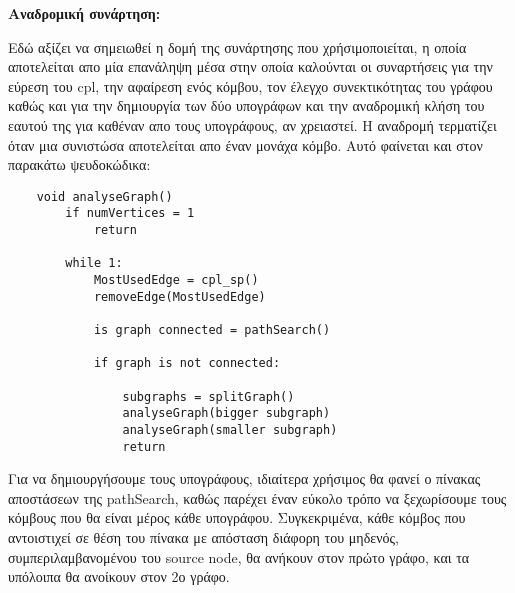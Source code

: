 \documentclass{article}
\begin{document}
\textbf{Αναδρομική συνάρτηση:}\bigbreak

Εδώ αξίζει να σημειωθεί η δομή της συνάρτησης που χρήσιμοποιείται, η οποία αποτελείται απο μία επανάληψη μέσα στην οποία καλούνται οι συναρτήσεις για την εύρεση του
cpl, την αφαίρεση ενός κόμβου, τον έλεγχο συνεκτικότητας του γράφου καθώς και για την δημιουργία των δύο υπογράφων και
την αναδρομική κλήση του εαυτού της για καθέναν απο τους υπογράφους, αν χρειαστεί. Η αναδρομή τερματίζει όταν μια συνιστώσα αποτελείται απο έναν μονάχα κόμβο.
Αυτό φαίνεται και στον παρακάτω ψευδοκώδικα:\bigbreak

\begin{lstlisting}
	void analyseGraph()
		if numVertices = 1	
			return
		
		while 1:
			MostUsedEdge = cpl_sp()
			removeEdge(MostUsedEdge)
			
			is graph connected = pathSearch()
	
			if graph is not connected:

				subgraphs = splitGraph()
				analyseGraph(bigger subgraph)								
				analyseGraph(smaller subgraph)				
				return
\end{lstlisting}\bigbreak{}

Για να δημιουργήσουμε τους υπογράφους, ιδιαίτερα χρήσιμος θα φανεί ο πίνακας αποστάσεων της pathSearch,
καθώς παρέχει έναν εύκολο τρόπο να ξεχωρίσουμε τους κόμβους που θα είναι μέρος κάθε υπογράφου. Συγκεκριμένα, κάθε κόμβος που αντοιστιχεί σε θέση του πίνακα
με απόσταση διάφορη του μηδενός, συμπεριλαμβανομένου του source node, θα ανήκουν στον πρώτο γράφο, και τα 
υπόλοιπα θα ανοίκουν στον 2ο γράφο.\bigbreak
\end{document}
